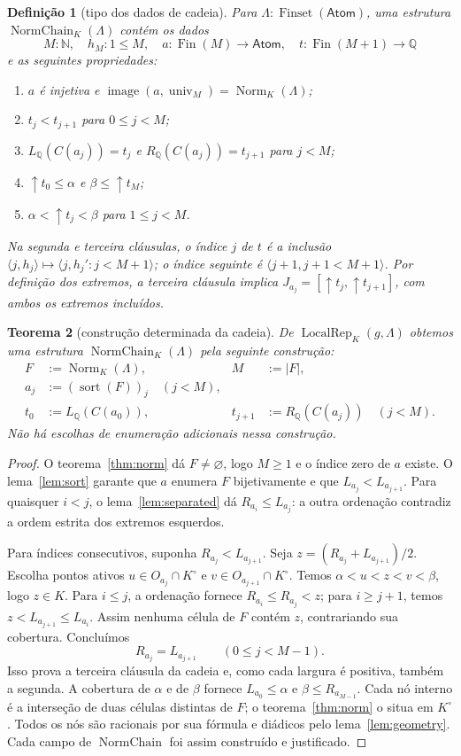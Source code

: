 \documentclass[11pt,a4paper]{article}
\newtheorem{definicao}{Definição}[section]
\newtheorem{teorema}[definicao]{Teorema}
\newcommand{\N}{\mathbb N}
\newcommand{\Q}{\mathbb Q}
\newcommand{\Atoms}{\mathsf{Atom}}
\newcommand{\Fin}{\operatorname{Fin}}
\newcommand{\FS}{\operatorname{Finset}}
\newcommand{\Norm}{\operatorname{Norm}}
\newcommand{\Loc}{\operatorname{LocalRep}}
\begin{document}
\begin{definicao}[tipo dos dados de cadeia]\label{def:chain}
Para $\Lambda:\FS(\Atoms)$, uma estrutura
$\operatorname{NormChain}_K(\Lambda)$ contém os dados
\[
 M:\N,\quad h_M:1\le M,\quad
 a:\Fin(M)\to\Atoms,\quad t:\Fin(M+1)\to\Q
\]
e as seguintes propriedades:
\begin{enumerate}
\item $a$ é injetiva e
$\operatorname{image}(a,\operatorname{univ}_M)=\Norm_K(\Lambda)$;
\item $t_j<t_{j+1}$ para $0\le j<M$;
\item $L_\Q(C(a_j))=t_j$ e $R_\Q(C(a_j))=t_{j+1}$ para $j<M$;
\item $\uparrow t_0\le\alpha$ e $\beta\le\uparrow t_M$;
\item $\alpha<\uparrow t_j<\beta$ para $1\le j<M$.
\end{enumerate}
Na segunda e terceira cláusulas, o índice $j$ de $t$ é a inclusão
$\langle j,h_j\rangle\mapsto\langle j,h_j':j<M+1\rangle$;
o índice seguinte é $\langle j+1,j+1<M+1\rangle$.
Por definição dos extremos, a terceira cláusula implica
$J_{a_j}=[\uparrow t_j,\uparrow t_{j+1}]$, com ambos os extremos incluídos.
\end{definicao}

\begin{teorema}[construção determinada da cadeia]\label{thm:chain}
De $\Loc_K(g,\Lambda)$ obtemos uma estrutura
$\operatorname{NormChain}_K(\Lambda)$ pela seguinte construção:
\begin{align*}
 F&:=\Norm_K(\Lambda),& M&:=|F|,\\
 a_j&:=(\operatorname{sort}(F))_j\quad(j<M),\\
 t_0&:=L_\Q(C(a_0)),&
 t_{j+1}&:=R_\Q(C(a_j))\quad(j<M).
\end{align*}
Não há escolhas de enumeração adicionais nessa construção.
\end{teorema}
\begin{proof}
O teorema~\ref{thm:norm} dá $F\ne\varnothing$, logo $M\ge1$
e o índice zero de $a$ existe. O lema~\ref{lem:sort} garante
que $a$ enumera $F$ bijetivamente e que $L_{a_j}<L_{a_{j+1}}$.
Para quaisquer $i<j$, o lema~\ref{lem:separated} dá
$R_{a_i}\le L_{a_j}$: a outra ordenação contradiz a ordem
estrita dos extremos esquerdos.

Para índices consecutivos, suponha
$R_{a_j}<L_{a_{j+1}}$. Seja
$z=(R_{a_j}+L_{a_{j+1}})/2$. Escolha pontos ativos
$u\in O_{a_j}\cap K^\circ$ e
$v\in O_{a_{j+1}}\cap K^\circ$. Temos
$\alpha<u<z<v<\beta$, logo $z\in K$.
Para $i\le j$, a ordenação fornece $R_{a_i}\le R_{a_j}<z$;
para $i\ge j+1$, temos $z<L_{a_{j+1}}\le L_{a_i}$.
Assim nenhuma célula de $F$ contém $z$, contrariando sua cobertura.
Concluímos
\[
 R_{a_j}=L_{a_{j+1}}\qquad(0\le j<M-1).
\]
Isso prova a terceira cláusula da cadeia e, como cada largura é
positiva, também a segunda. A cobertura de $\alpha$ e de $\beta$
fornece $L_{a_0}\le\alpha$ e $\beta\le R_{a_{M-1}}$.
Cada nó interno é a interseção de duas células distintas de $F$;
o teorema~\ref{thm:norm} o situa em $K^\circ$.
Todos os nós são racionais por sua fórmula e diádicos pelo
lema~\ref{lem:geometry}. Cada campo de
$\operatorname{NormChain}$ foi assim construído e justificado.
\end{proof}
\end{document}
